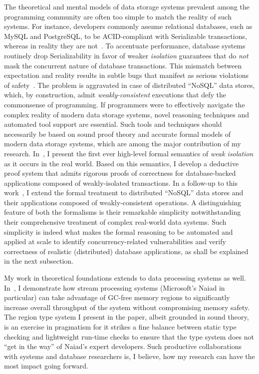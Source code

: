 The theoretical and mental models of data storage systems prevalent
among the programming community are often too simple to match the
reality of such systems. For instance, developers commonly assume
relational databases, such as MySQL and PostgreSQL, to be
ACID-compliant with Serializable transactions, whereas in reality they
are not~\cite{bailishotos}. To accentuate performance, database
systems routinely drop Serializability in favor of weaker
\emph{isolation} guarantees that do \emph{not} mask the concurrent
nature of database transactions. This mismatch between expectation and
reality results in subtle bugs that manifest as serious violations of
safety~\cite{poloniexbug,acidrain}. The problem is aggravated in case
of distributed ``NoSQL'' data stores, which, by construction, admit
\emph{weakly-consistent} executions that defy the commonsense of
programming.  If programmers were to effectively navigate the complex
reality of modern data storage systems, novel reasoning techniques and
automated tool support are essential. Such tools and techniques should
necessarily be based on sound proof theory and accurate formal models
of modern data storage systems, which are among the major contribution
of my research.  In~\cite{popl18}, I present the first ever high-level
formal semantics of \emph{weak isolation} as it occurs in the real
world. Based on this semantics, I develop a deductive proof system
that admits rigorous proofs of correctness for database-backed
applications composed of weakly-isolated transactions.  In a follow-up
to this work~\cite{oopsla18}, I extend the formal treatment to
distributed ``NoSQL'' data stores and their applications composed of
weakly-consistent operations. A distinguishing feature of both the
formalisms is their remarkable simplicity notwithstanding their
comprehensive treatment of complex real-world data systems. Such
simplicity is indeed what makes the formal reasoning to be automated
and applied at scale to identify concurrency-related vulnerabilities
and verify correctness of realistic (distributed) database
applications, as shall be explained in the next subsection.

My work in theoretical foundations extends to data processing systems
as well. In~\cite{ecoop18}, I demonstrate how stream processing
systems (Microsoft's Naiad in particular) can take advantage of
GC-free memory regions to significantly increase overall
throughput of the system without compromising memory safety.
The region type system I present in the paper, albeit grounded in
sound theory, is an exercise in pragmatism for it strikes a fine
balance between static type checking and lightweight run-time checks
to ensure that the type system does not ``get in the way'' of Naiad's
expert developers. Such productive collaborations with systems and
database researchers is, I believe, how my research can have the most
impact going forward.

